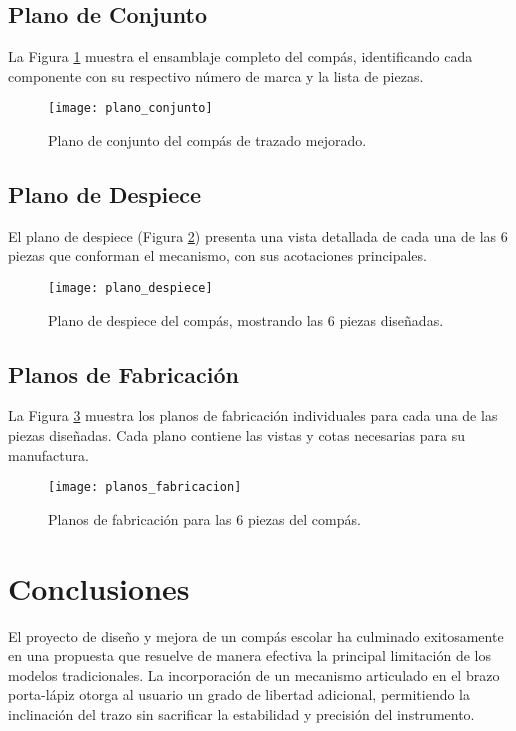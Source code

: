 \documentclass[11pt, a4paper]{article}
\begin{document}
\subsection{Plano de Conjunto}
La Figura \ref{fig:conjunto} muestra el ensamblaje completo del compás, identificando cada componente con su respectivo número de marca y la lista de piezas.

\begin{figure}[H]
    \centering
    \texttt{[image: plano\_conjunto]}
    \caption{Plano de conjunto del compás de trazado mejorado.}
    \label{fig:conjunto}
\end{figure}
\newpage

\subsection{Plano de Despiece}
El plano de despiece (Figura \ref{fig:despiece}) presenta una vista detallada de cada una de las 6 piezas que conforman el mecanismo, con sus acotaciones principales.

\begin{figure}[H]
    \centering
    \texttt{[image: plano\_despiece]}
    \caption{Plano de despiece del compás, mostrando las 6 piezas diseñadas.}
    \label{fig:despiece}
\end{figure}
\newpage

\subsection{Planos de Fabricación}
La Figura \ref{fig:fabricacion} muestra los planos de fabricación individuales para cada una de las piezas diseñadas. Cada plano contiene las vistas y cotas necesarias para su manufactura.

\begin{figure}[H]
    \centering
    \texttt{[image: planos\_fabricacion]}
    \caption{Planos de fabricación para las 6 piezas del compás.}
    \label{fig:fabricacion}
\end{figure}

\newpage
\section{Conclusiones}
El proyecto de diseño y mejora de un compás escolar ha culminado exitosamente en una propuesta que resuelve de manera efectiva la principal limitación de los modelos tradicionales. La incorporación de un mecanismo articulado en el brazo porta-lápiz otorga al usuario un grado de libertad adicional, permitiendo la inclinación del trazo sin sacrificar la estabilidad y precisión del instrumento.
\end{document}
